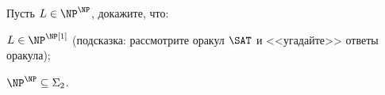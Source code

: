 Пусть $L \in \NP^{\NP}$, докажите, что:
\begin{enumcyr}
	\item $L \in \NP^{\NP[1]}$ (подсказка: рассмотрите оракул $\SAT$ и <<угадайте>> ответы оракула);
    \item $\NP^{\NP} \subseteq \Sigma_2$.
\end{enumcyr}
